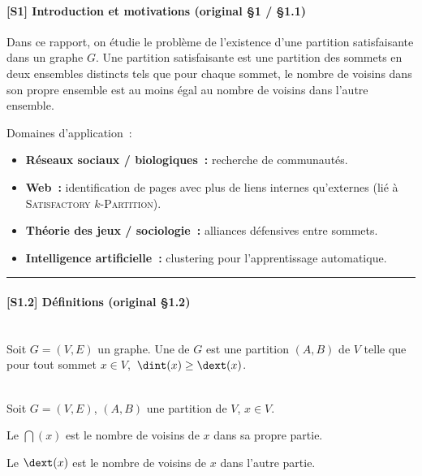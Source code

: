 \paragraph{[S1] Introduction et motivations (original §1 / §1.1)}

Dans ce rapport, on étudie le problème de l'existence d'une partition satisfaisante dans un graphe $G$.
Une partition satisfaisante est une partition des sommets en deux ensembles distincts tels que pour chaque sommet, le nombre de voisins dans son propre ensemble est au moins égal au nombre de voisins dans l'autre ensemble.

\medskip Domaines d'application~:
\begin{itemize}
    \item \textbf{Réseaux sociaux / biologiques~:} recherche de communautés.
    \item \textbf{Web~:} identification de pages avec plus de liens internes qu'externes
          (lié à \textsc{Satisfactory} $k$-\textsc{Partition}).
    \item \textbf{Théorie des jeux / sociologie~:} alliances défensives entre sommets.
    \item \textbf{Intelligence artificielle~:} clustering pour l'apprentissage automatique.
\end{itemize}

\bigskip\hrule\bigskip

\paragraph{[S1.2] Définitions (original §1.2)}

\begin{definition}\,\\
    Soit $G = (V, E)$ un graphe.
    Une  de $G$ est une partition $(A, B)$ de $V$ telle que
    pour tout sommet $x \in V$,\ $\dint(x) \geq \dext(x)$.
\end{definition}

\begin{definition}\,\\
    Soit $G = (V, E)$, $(A, B)$ une partition de $V$, $x \in V$.

    Le  $\dint(x)$ est le nombre de voisins de $x$ dans sa propre partie.

    Le  $\dext(x)$ est le nombre de voisins de $x$ dans l'autre partie.
\end{definition}

